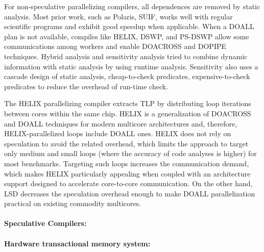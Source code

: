 For non-speculative parallelizing compilers, all dependences are removed by
static analysis. Most prior work, such as Polaris, SUIF, works well with regular
scientific programs and exhibit good speedup when applicable. When a DOALL plan
is not available, compiles like HELIX, DSWP, and PS-DSWP allow some
communications among workers and enable DOACROSS and DOPIPE techniques. Hybrid
analysis and sensitivity analysis tried to combine dynamic information with
static analysis by using runtime analysis. Sensitivity also uses a cascade
design of static analysis, cheap-to-check predicates, expensive-to-check
predicates to reduce the overhead of run-time check.


The HELIX parallelizing compiler extracts TLP by distributing loop iterations between cores within the same chip.
HELIX is a generalization of DOACROSS and DOALL techniques for modern multicore architectures and, therefore, HELIX-parallelized loops include DOALL ones.
HELIX does not rely on speculation to avoid the related overhead, which limits the approach to target only medium and small loops (where the accuracy of code analyses is higher) for most benchmarks.
Targeting such loops increases the communication demand, which makes HELIX particularly appealing when coupled with an architecture support designed to accelerate core-to-core communication.
On the other hand, LSD decreases the speculation overhead enough to make DOALL parallelization practical on existing commodity multicores.



\paragraph{Speculative Compilers:}

\paragraph{Hardware transactional memory system:}

